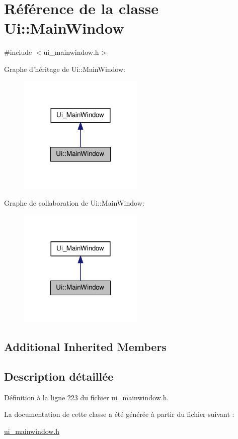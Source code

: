 \hypertarget{class_ui_1_1_main_window}{\section{Référence de la classe Ui\-:\-:Main\-Window}
\label{class_ui_1_1_main_window}
}


{\ttfamily \#include $<$ui\-\_\-mainwindow.\-h$>$}



Graphe d'héritage de Ui\-:\-:Main\-Window\-:\nopagebreak
\begin{figure}[H]
\begin{center}
\leavevmode
\includegraphics[width=168pt]{class_ui_1_1_main_window__inherit__graph}
\end{center}
\end{figure}


Graphe de collaboration de Ui\-:\-:Main\-Window\-:\nopagebreak
\begin{figure}[H]
\begin{center}
\leavevmode
\includegraphics[width=168pt]{class_ui_1_1_main_window__coll__graph}
\end{center}
\end{figure}
\subsection*{Additional Inherited Members}


\subsection{Description détaillée}


Définition à la ligne 223 du fichier ui\-\_\-mainwindow.\-h.



La documentation de cette classe a été générée à partir du fichier suivant \-:\begin{DoxyCompactItemize}
\item 
\hyperlink{ui__mainwindow_8h}{ui\-\_\-mainwindow.\-h}\end{DoxyCompactItemize}
